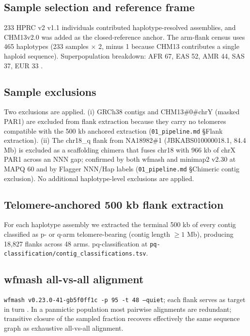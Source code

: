 \documentclass[pdflatex,mathphys]{jnl}
\begin{document}
\setcounter{figure}{0}

\subsection*{Sample selection and reference frame}

233 HPRC v2 v1.1 individuals contributed haplotype-resolved assemblies, and
CHM13v2.0 was added as the closed-reference anchor.
The arm-flank census uses 465 haplotypes (233 samples $\times$ 2, minus 1
because CHM13 contributes a single haploid sequence).
Superpopulation breakdown: AFR 67, EAS 52, AMR 44, SAS 37, EUR 33
.

\subsection*{Sample exclusions}

Two exclusions are applied.
(i) GRCh38 contigs and CHM13\#0\#chrY (masked PAR1) are excluded from flank
extraction because they carry no telomeres compatible with the 500 kb anchored
extraction (\texttt{01\_pipeline.md} \S Flank extraction).
(ii) The chr18\_q flank from NA18982\#1 (JBKABS010000018.1, 84.4 Mb) is
excluded as a scaffolding chimera that fuses chr18 with 966 kb of chrX PAR1
across an NNN gap; confirmed by both wfmash and minimap2 v2.30 at MAPQ 60 and
by Flagger NNN/Hap labels (\texttt{01\_pipeline.md} \S Chimeric contig
exclusion).
No additional haplotype-level exclusions are applied.

\subsection*{Telomere-anchored 500 kb flank extraction}

For each haplotype assembly we extracted the terminal 500 kb of every contig
classified as p- or q-arm telomere-bearing (contig length $\geq 1$ Mb),
producing 18,827 flanks across 48 arms.
pq-classification at \texttt{pq-classification/contig\_classifications.tsv}.

\subsection*{wfmash all-vs-all alignment}

\texttt{wfmash v0.23.0-41-gb5f0ff1c -p 95 -t 48 --quiet}; each flank serves
as target in turn .
In a panmictic population most pairwise alignments are redundant; transitive
closure of the sampled fraction recovers effectively the same sequence graph as
exhaustive all-vs-all alignment.
\end{document}
